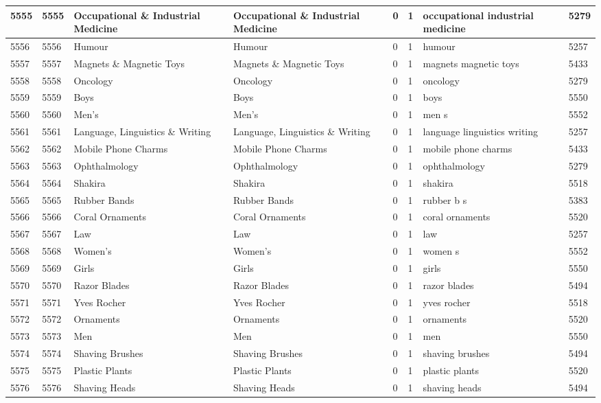 \begin{longtable}{|l|l|l|l|l|l|l|l|}
5555 & 5555 & Occupational \& Industrial Medicine & Occupational \& Industrial Medicine & 0 & 1 & occupational industrial medicine & 5279 \\ \hline 
5556 & 5556 & Humour & Humour & 0 & 1 & humour & 5257 \\ \hline 
5557 & 5557 & Magnets \& Magnetic Toys & Magnets \& Magnetic Toys & 0 & 1 & magnets magnetic toys & 5433 \\ \hline 
5558 & 5558 & Oncology & Oncology & 0 & 1 & oncology & 5279 \\ \hline 
5559 & 5559 & Boys & Boys & 0 & 1 & boys & 5550 \\ \hline 
5560 & 5560 & Men's & Men's & 0 & 1 & men s & 5552 \\ \hline 
5561 & 5561 & Language, Linguistics \& Writing & Language, Linguistics \& Writing & 0 & 1 & language linguistics writing & 5257 \\ \hline 
5562 & 5562 & Mobile Phone Charms & Mobile Phone Charms & 0 & 1 & mobile phone charms & 5433 \\ \hline 
5563 & 5563 & Ophthalmology & Ophthalmology & 0 & 1 & ophthalmology & 5279 \\ \hline 
5564 & 5564 & Shakira & Shakira & 0 & 1 & shakira & 5518 \\ \hline 
5565 & 5565 & Rubber Bands & Rubber Bands & 0 & 1 & rubber b s & 5383 \\ \hline 
5566 & 5566 & Coral Ornaments & Coral Ornaments & 0 & 1 & coral ornaments & 5520 \\ \hline 
5567 & 5567 & Law & Law & 0 & 1 & law & 5257 \\ \hline 
5568 & 5568 & Women's & Women's & 0 & 1 & women s & 5552 \\ \hline 
5569 & 5569 & Girls & Girls & 0 & 1 & girls & 5550 \\ \hline 
5570 & 5570 & Razor Blades & Razor Blades & 0 & 1 & razor blades & 5494 \\ \hline 
5571 & 5571 & Yves Rocher & Yves Rocher & 0 & 1 & yves rocher & 5518 \\ \hline 
5572 & 5572 & Ornaments & Ornaments & 0 & 1 & ornaments & 5520 \\ \hline 
5573 & 5573 & Men & Men & 0 & 1 & men & 5550 \\ \hline 
5574 & 5574 & Shaving Brushes & Shaving Brushes & 0 & 1 & shaving brushes & 5494 \\ \hline 
5575 & 5575 & Plastic Plants & Plastic Plants & 0 & 1 & plastic plants & 5520 \\ \hline 
5576 & 5576 & Shaving Heads & Shaving Heads & 0 & 1 & shaving heads & 5494 \\ \hline 

\end{longtable}
